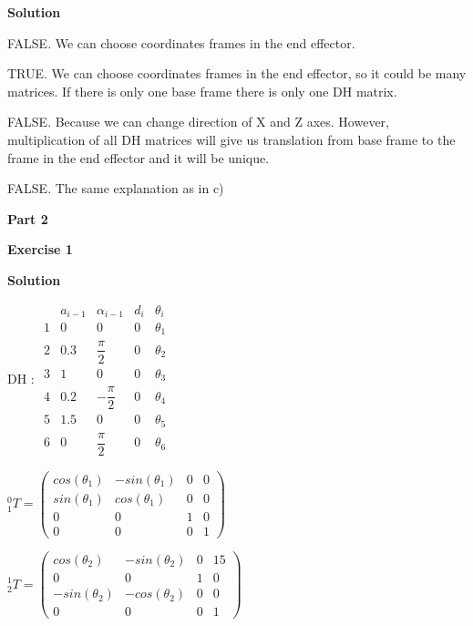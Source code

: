 \documentclass[8pt]{article}
\begin{document}
\textbf{Solution}

\medskip

\begin{list}{()~}{}
\item
FALSE. We can choose coordinates frames in the end effector.
\item
TRUE. We can choose coordinates frames in the end effector, so it could be many matrices. If there is only one base frame there is only one DH matrix.
\item
FALSE. Because we can change direction of X and Z axes. However, multiplication of all DH matrices will give us translation from base frame to the frame in the end effector and it will be unique.
\item
FALSE. The same explanation as in c)
\end{list}

\textbf{Part 2}	

\bigskip

\textbf{Exercise 1}		
		
\textbf{Solution}

\medskip

DH :
$ \begin{array}{ccccc}
& a_{i-1} & \alpha_{i-1} & d_i & \theta_i \\
1 & 0 & 0 & 0 & \theta_1 \\
2 & 0.3 & \dfrac{\pi}{2} & 0 & \theta_2 \\
3 & 1 & 0 & 0 & \theta_3 \\
4 & 0.2 & - \dfrac{\pi}{2} & 0 & \theta_4 \\
5 & 1.5 & 0 & 0 & \theta_5 \\
6 & 0 & \dfrac{\pi}{2} & 0 & \theta_6
\end{array} $

$^0_1T = \left( \begin{array}{cccc}
cos(\theta_1) & -sin(\theta_1) & 0 & 0 \\
sin(\theta_1) & cos(\theta_1) & 0 & 0 \\
0 & 0 & 1 & 0 \\
0 & 0 & 0 & 1
\end{array} \right) $

$^1_2T = \left( \begin{array}{cccc}
cos(\theta_2) & -sin(\theta_2) & 0 & 15 \\
0 & 0 & 1 & 0 \\
-sin(\theta_2) & -cos(\theta_2) & 0 & 0 \\
0 & 0 & 0 & 1
\end{array} \right) $
\end{document}
